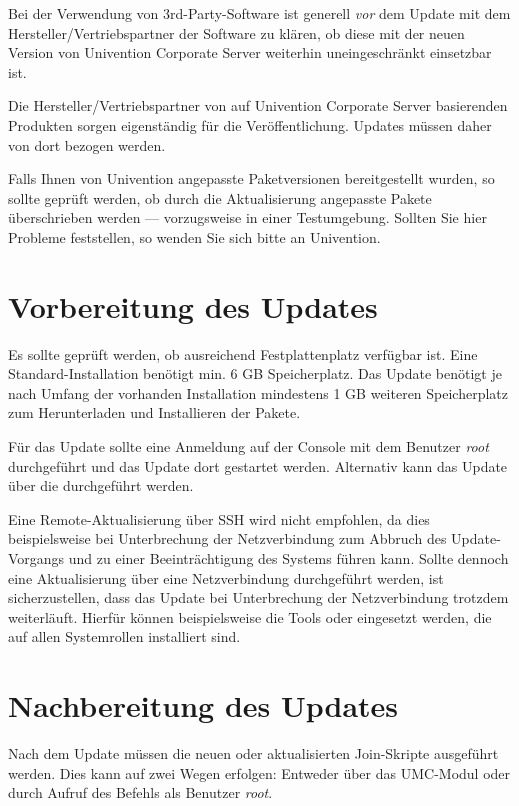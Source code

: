 Bei der Verwendung von 3rd-Party-Software ist generell \emph{vor} dem Update
mit dem Hersteller/Vertriebspartner der Software zu klären, ob
diese mit der neuen Version von Univention Corporate Server weiterhin
uneingeschränkt einsetzbar ist. 

Die Hersteller/Vertriebspartner von auf Univention Corporate Server
basierenden Produkten sorgen eigenständig für die Veröffentlichung. Updates
müssen daher von dort bezogen werden.

Falls Ihnen von Univention angepasste Paketversionen bereitgestellt wurden, so
sollte geprüft werden, ob durch die Aktualisierung angepasste Pakete
überschrieben werden --- vorzugsweise in einer Testumgebung. Sollten Sie hier
Probleme feststellen, so wenden Sie sich bitte an Univention.

\chapter{Vorbereitung des Updates}
Es sollte geprüft werden, ob ausreichend Festplattenplatz verfügbar ist. Eine
Standard-Installation benötigt min. 6 GB Speicherplatz. Das
Update benötigt je nach Umfang der vorhanden Installation mindestens 1 GB
weiteren Speicherplatz zum Herunterladen und Installieren der Pakete.

Für das Update sollte eine Anmeldung auf der Console mit dem
Benutzer \emph{root} durchgeführt und das Update dort gestartet werden.
Alternativ kann das Update über die \ucsUMC{} durchgeführt werden.

Eine Remote-Aktualisierung über SSH wird nicht empfohlen, da dies
beispielsweise bei Unterbrechung der Netzverbindung zum Abbruch des
Update-Vorgangs und zu einer Beeinträchtigung des Systems führen kann. Sollte
dennoch eine Aktualisierung über eine Netzverbindung durchgeführt werden, ist
sicherzustellen, dass das Update bei Unterbrechung der Netzverbindung trotzdem
weiterläuft. Hierfür können beispielsweise die Tools  oder
 eingesetzt werden, die auf allen Systemrollen installiert sind.




\chapter{Nachbereitung des Updates}

Nach dem Update müssen die neuen oder aktualisierten Join-Skripte
ausgeführt werden. Dies kann auf zwei Wegen erfolgen: Entweder über
das UMC-Modul  oder durch Aufruf des
Befehls  als
Benutzer \emph{root}.

